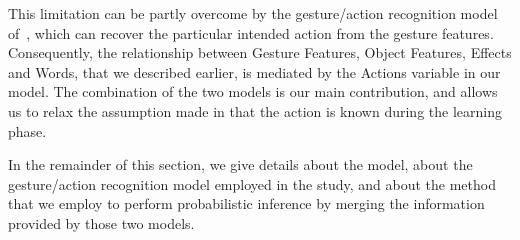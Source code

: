 This limitation can be partly overcome by the gesture/action recognition model of~\cite{saponaro:2013:crhri}, which can recover the particular intended action from the gesture features.
Consequently, the relationship between Gesture Features, Object Features, Effects and Words, that we described earlier, is mediated by the Actions variable in our model.
The combination of the two models is our main contribution, and allows us to relax the assumption made in \cite{salvi:2012:smcb} that the action is known during the learning phase.

In the remainder of this section, we give details about the \affword{} model, about the gesture/action recognition model employed in the study, and about the method that we employ to perform probabilistic inference by merging the information provided by those two models.





